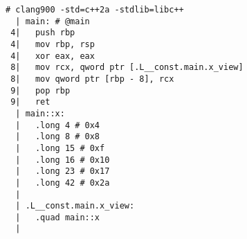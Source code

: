 \begin{lstlisting}[language={},numbers=none,title=\href{https://godbolt.org/z/Ga5Ysv}{\texttt{godbolt.org/z/Ga5Ysv}}]
# clang900 -std=c++2a -stdlib=libc++
  | main: # @main
 4|   push rbp
 4|   mov rbp, rsp
 4|   xor eax, eax
 8|   mov rcx, qword ptr [.L__const.main.x_view]
 8|   mov qword ptr [rbp - 8], rcx
 9|   pop rbp
 9|   ret
  | main::x:
  |   .long 4 # 0x4
  |   .long 8 # 0x8
  |   .long 15 # 0xf
  |   .long 16 # 0x10
  |   .long 23 # 0x17
  |   .long 42 # 0x2a
  | 
  | .L__const.main.x_view:
  |   .quad main::x
  |
\end{lstlisting}
